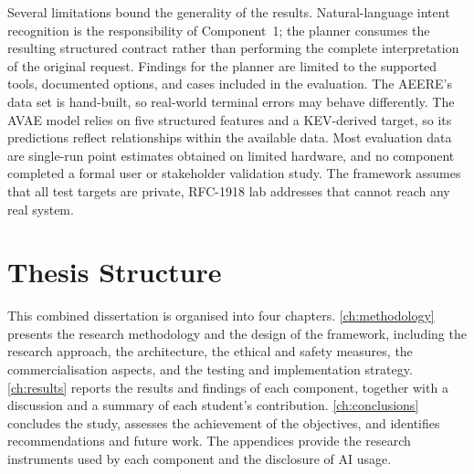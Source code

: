 Several limitations bound the generality of the results. Natural-language intent
recognition is the responsibility of Component~1; the planner consumes the
resulting structured contract rather than performing the complete
interpretation of the original request. Findings for the planner are limited to
the supported tools, documented options, and cases included in the evaluation.
The AEERE's data set is hand-built, so real-world terminal errors may behave
differently. The AVAE model relies on five structured features and a
KEV-derived target, so its predictions reflect relationships within the
available data. Most evaluation data are single-run point estimates obtained on
limited hardware, and no component completed a formal user or stakeholder
validation study. The framework assumes that all test targets are private,
RFC-1918 lab addresses that cannot reach any real system.

\section{Thesis Structure}\label{sec:structure}

This combined dissertation is organised into four chapters. \cref{ch:methodology}
presents the research methodology and the design of the framework, including the
research approach, the architecture, the ethical and safety measures, the
commercialisation aspects, and the testing and implementation strategy.
\cref{ch:results} reports the results and findings of each component, together
with a discussion and a summary of each student's contribution.
\cref{ch:conclusions} concludes the study, assesses the achievement of the
objectives, and identifies recommendations and future work. The appendices
provide the research instruments used by each component and the disclosure of
AI usage.